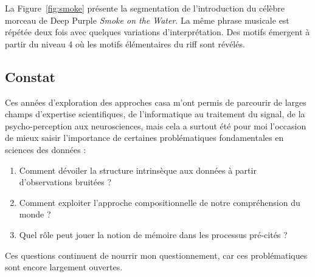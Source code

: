 
  La Figure~\ref{fig:smoke} présente la segmentation de l'introduction du célèbre morceau de Deep Purple \emph{Smoke on the Water}. La même phrase musicale est répétée deux fois avec quelques variations d'interprétation. Des motifs émergent à partir du niveau 4 où les motifs élémentaires du riff sont révélés.

  \subsection{Constat}

  Ces années d'exploration des approches casa m'ont permis de parcourir de larges champs d'expertise scientifiques, de l'informatique au traitement du signal, de la psycho-perception aux neurosciences, mais cela a surtout été pour moi l'occasion de mieux saisir l'importance de certaines problématiques fondamentales en sciences des données :
  \begin{enumerate}
    \item Comment dévoiler la structure intrinsèque aux données à partir d'observations bruitées ?
    \item Comment exploiter l'approche compositionnelle de notre compréhension du monde ?
    \item Quel rôle peut jouer la notion de mémoire dans les processus pré-cités ?
  \end{enumerate}
  Ces questions continuent de nourrir mon questionnement, car ces problématiques sont encore largement ouvertes.

